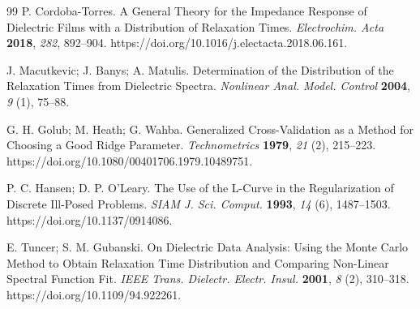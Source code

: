 \documentclass[11pt]{article}
\begin{document}
\begin{thebibliography}{99}
P. Cordoba-Torres. A General Theory for the Impedance Response of Dielectric Films with a Distribution of Relaxation Times. \textit{Electrochim. Acta} \textbf{2018}, \textit{282}, 892--904. https://doi.org/10.1016/j.electacta.2018.06.161.

J. Macutkevic; J. Banys; A. Matulis. Determination of the Distribution of the Relaxation Times from Dielectric Spectra. \textit{Nonlinear Anal. Model. Control} \textbf{2004}, \textit{9} (1), 75--88.

G. H. Golub; M. Heath; G. Wahba. Generalized Cross-Validation as a Method for Choosing a Good Ridge Parameter. \textit{Technometrics} \textbf{1979}, \textit{21} (2), 215--223. https://doi.org/10.1080/00401706.1979.10489751.

P. C. Hansen; D. P. O'Leary. The Use of the L-Curve in the Regularization of Discrete Ill-Posed Problems. \textit{SIAM J. Sci. Comput.} \textbf{1993}, \textit{14} (6), 1487--1503. https://doi.org/10.1137/0914086.

E. Tuncer; S. M. Gubanski. On Dielectric Data Analysis: Using the Monte Carlo Method to Obtain Relaxation Time Distribution and Comparing Non-Linear Spectral Function Fit. \textit{IEEE Trans. Dielectr. Electr. Insul.} \textbf{2001}, \textit{8} (2), 310--318. https://doi.org/10.1109/94.922261.
\end{thebibliography}
\end{document}
